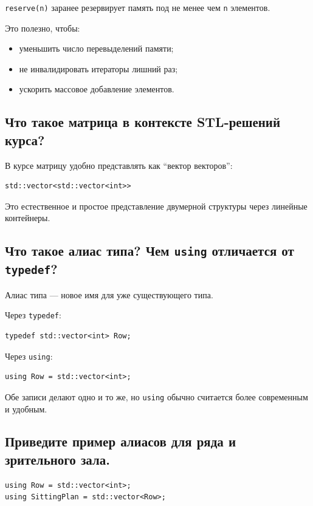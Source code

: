\texttt{reserve(n)} заранее резервирует память под не менее чем \texttt{n} элементов.

Это полезно, чтобы:
\begin{itemize}
    \item уменьшить число перевыделений памяти;
    \item не инвалидировать итераторы лишний раз;
    \item ускорить массовое добавление элементов.
\end{itemize}


\subsection{Что такое матрица в контексте STL-решений курса?}

В курсе матрицу удобно представлять как ``вектор векторов'':
\begin{verbatim}
std::vector<std::vector<int>>
\end{verbatim}

Это естественное и простое представление двумерной структуры через линейные контейнеры.


\subsection{Что такое алиас типа? Чем \texttt{using} отличается от \texttt{typedef}?}

Алиас типа --- новое имя для уже существующего типа.

Через \texttt{typedef}:
\begin{verbatim}
typedef std::vector<int> Row;
\end{verbatim}

Через \texttt{using}:
\begin{verbatim}
using Row = std::vector<int>;
\end{verbatim}

Обе записи делают одно и то же, но \texttt{using} обычно считается более современным и удобным.


\subsection{Приведите пример алиасов для ряда и зрительного зала.}

\begin{verbatim}
using Row = std::vector<int>;
using SittingPlan = std::vector<Row>;
\end{verbatim}



